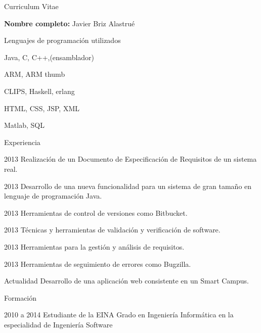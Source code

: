 \begin{cv}{Curriculum Vitae}

\vspace{0.8cm}
\textbf{Nombre completo:} Javier Briz Alastrué
\vspace{0.8cm}

\begin{cvlist}{Lenguajes de programación utilizados}
\item Java, C, C++,(ensamblador)
\item ARM, ARM thumb
\item CLIPS, Haskell, erlang
\item HTML, CSS, JSP, XML
\item Matlab, SQL
\end{cvlist}

\begin{cvlist}{Experiencia}

	\item[2013] Realización de un Documento de Especificación de Requisitos 
				de un sistema real.
	
	\item[2013] Desarrollo de una nueva funcionalidad para un sistema de gran 
				tama\~no en lenguaje de programación Java.
	
	\item[2013] Herramientas de control de versiones como Bitbucket.
	
	\item[2013] Técnicas y herramientas de validación y verificación de software.
	
	\item[2013] Herramientas para la gestión y análisis de requisitos.
	
	\item[2013] Herramientas de seguimiento de errores como Bugzilla.
	
	\item[Actualidad] Desarrollo de una aplicación web consistente en un Smart Campus.

\end{cvlist}

\begin{cvlist}{Formación}

	\item[2010 a 2014] Estudiante de la EINA
		Grado en Ingeniería Informática en la especialidad de Ingeniería Software


\end{cvlist}

\end{cv}